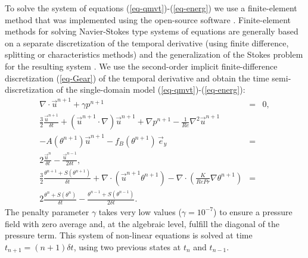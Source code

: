 To solve the system of equations (\ref{eq-qmvt})-(\ref{eq-energ}) we use a finite-element method that was implemented using the open-source software \ff \citep{freefem,hecht-2012-JNM}.
Finite-element methods for solving Navier-Stokes type systems of equations  are generally based on a separate discretization of the temporal derivative (using finite difference, splitting or characteristics methods) and the generalization of the Stokes problem for the resulting system \citep{Temam,GRaviart,Quarteroni}. 
We use the second-order implicit finite-difference discretization (\ref{eq-Gear}) of the temporal derivative and obtain the time semi-discretization of the single-domain model (\ref{eq-qmvt})-(\ref{eq-energ}):
\begin{eqnarray} \label{eq-time-disc1}
\nabla\cdot \vec{u}^{n+1} + {\gamma} p^{n+1} &=& 0, \\ %
\frac{3}{2} \frac{\vec{u}^{n+1}}{\delta t} +(\vec{u}^{n+1}\cdot\nabla) \vec{u}^{n+1} +\nabla p^{n+1} 
- {\frac{1}{Re} \nabla^2 \vec u^{n+1}}  & & \\ \nonumber 
- A(\theta^{n+1})\vec u^{n+1}- f_B(\theta^{n+1}) \, \vec{e}_y &=&  \\ \nonumber
2 \frac{\vec{u}^{n}}{\delta t}-\frac{\vec{u}^{n-1}}{2\delta t},\\ \label{eq-time-disc3}
\frac{3}{2} \frac{\theta^{n+1} + S(\theta^{n+1})}{\delta t} +
\nabla\cdot\left(\vec{u}^{n+1} \theta^{n+1}\right)
- \nabla \cdot\left( \frac{K}{RePr} \nabla \theta^{n+1} \right) &=& \\  \nonumber
2\frac{ \theta^{n} + S(\theta^{n})}{\delta t}-\frac{ \theta^{n-1} + S(\theta^{n-1}) }{2\delta t}.
\end{eqnarray}
The penalty parameter $\gamma$ takes very low values ($\gamma=10^{-7}$)  to ensure a pressure field with zero average and, at the algebraic level, fulfill the diagonal of the pressure term.  
This system of non-linear equations is solved at time  $t_{n+1}=(n+1) \delta t$, using two  previous states at $t_{n}$ and $t_{n-1}$.

